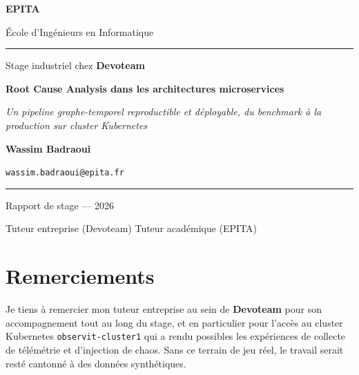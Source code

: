 \documentclass[a4paper,11pt,oneside]{report}
\begin{document}
\begin{titlepage}
  \centering
  \vspace*{1cm}
  {\Large\bfseries EPITA \par}
  {\large \'Ecole d'Ing\'enieurs en Informatique \par}
  \vspace{0.5cm}
  \rule{0.6\textwidth}{0.5pt}\par
  \vspace{0.5cm}
  {\large Stage industriel chez \textbf{Devoteam} \par}
  \vspace{3cm}
  {\Huge\bfseries Root Cause Analysis dans les architectures microservices \par}
  \vspace{0.8cm}
  {\Large\itshape Un pipeline graphe-temporel reproductible et d\'eployable, du benchmark \`a la production sur cluster Kubernetes \par}
  \vspace{3cm}
  {\Large \textbf{Wassim Badraoui} \par}
  \vspace{0.3cm}
  {\large \texttt{wassim.badraoui@epita.fr} \par}
  \vfill
  \rule{0.6\textwidth}{0.5pt}\par
  \vspace{0.5cm}
  {\large Rapport de stage --- 2026 \par}
  \vspace{0.3cm}
  {\small Tuteur entreprise (Devoteam) \quad\textbar\quad Tuteur acad\'emique (EPITA) \par}
\end{titlepage}

\chapter*{Remerciements}

Je tiens \`a remercier mon tuteur entreprise au sein de \textbf{Devoteam} pour son accompagnement tout au long du stage, et en particulier pour l'acc\`es au cluster Kubernetes \texttt{observit-cluster1} qui a rendu possibles les exp\'eriences de collecte de t\'el\'em\'etrie et d'injection de chaos. Sans ce terrain de jeu r\'eel, le travail serait rest\'e cantonn\'e \`a des donn\'ees synth\'etiques.
\end{document}
